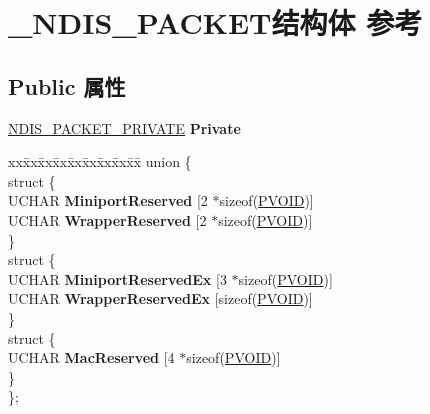 \hypertarget{struct___n_d_i_s___p_a_c_k_e_t}{}\section{\+\_\+\+N\+D\+I\+S\+\_\+\+P\+A\+C\+K\+E\+T结构体 参考}
\label{struct___n_d_i_s___p_a_c_k_e_t}
\subsection*{Public 属性}
\begin{DoxyCompactItemize}
\item 
\mbox{\label{struct___n_d_i_s___p_a_c_k_e_t_a1f45dfc675456265a2b73fc521345f2e}} 
\hyperlink{struct___n_d_i_s___p_a_c_k_e_t___p_r_i_v_a_t_e}{N\+D\+I\+S\+\_\+\+P\+A\+C\+K\+E\+T\+\_\+\+P\+R\+I\+V\+A\+TE} {\bfseries Private}
\item 
\mbox{\label{struct___n_d_i_s___p_a_c_k_e_t_af5eb4d6e7d1b216eab0bd88c74558c60}} 
\begin{tabbing}
xx\=xx\=xx\=xx\=xx\=xx\=xx\=xx\=xx\=\kill
union \{\\
\mbox{\label{union___n_d_i_s___p_a_c_k_e_t_1_1_0D1724_ad242e7d89855b869fefed46c663610d3}} 
\>struct \{\\
\>\>UCHAR {\bfseries MiniportReserved} \mbox{[}2 $\ast$sizeof(\hyperlink{interfacevoid}{PVOID})\mbox{]}\\
\>\>UCHAR {\bfseries WrapperReserved} \mbox{[}2 $\ast$sizeof(\hyperlink{interfacevoid}{PVOID})\mbox{]}\\
\>\} \\
\mbox{\label{union___n_d_i_s___p_a_c_k_e_t_1_1_0D1724_a6b1d7c8b2791afdc255d0fa28af982d5}} 
\>struct \{\\
\>\>UCHAR {\bfseries MiniportReservedEx} \mbox{[}3 $\ast$sizeof(\hyperlink{interfacevoid}{PVOID})\mbox{]}\\
\>\>UCHAR {\bfseries WrapperReservedEx} \mbox{[}sizeof(\hyperlink{interfacevoid}{PVOID})\mbox{]}\\
\>\} \\
\mbox{\label{union___n_d_i_s___p_a_c_k_e_t_1_1_0D1724_ab3b5c198e143f7a40da2e8e6b2bcb0e5}} 
\>struct \{\\
\>\>UCHAR {\bfseries MacReserved} \mbox{[}4 $\ast$sizeof(\hyperlink{interfacevoid}{PVOID})\mbox{]}\\
\>\} \\
\}; \\


\end{tabbing}
\end{DoxyCompactItemize}
